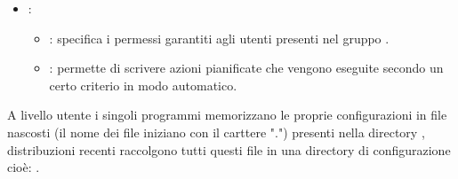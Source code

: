 \begin{itemize}
\begin{itemize}
    \end{itemize}
    \item {}:
    \begin{itemize}
        \item {}: specifica i permessi garantiti agli utenti presenti nel gruppo .
        \item {}: permette di scrivere azioni pianificate che vengono eseguite secondo un certo criterio in modo automatico.
    \end{itemize}
\end{itemize}
A livello utente i singoli programmi memorizzano le proprie configurazioni in file nascosti (il nome dei file iniziano con il carttere ".") presenti nella directory , distribuzioni recenti raccolgono tutti questi file in una directory di configurazione cioè: .






